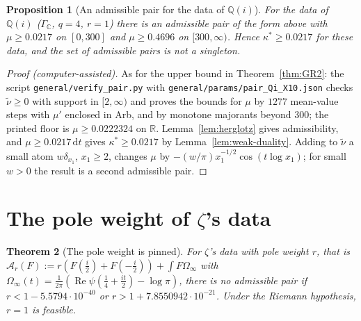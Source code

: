 \documentclass[11pt]{amsart}
\newcommand{\RR}{\mathbb R}
\newcommand{\QQ}{\mathbb Q}
\newcommand{\dd}{\,\mathrm d}
\renewcommand{\Re}{\operatorname{Re}}
\newcommand{\GC}{\Gamma_{\mathbb C}}
\newcommand{\Oinf}{\Omega_\infty}
\newcommand{\Arch}{\mathcal A}
\newcommand{\kstar}{\kappa^{*}}
\newtheorem{theorem}{Theorem}[section]
\newtheorem{proposition}[theorem]{Proposition}
\theoremstyle{definition}
\theoremstyle{remark}
\numberwithin{equation}{section}
\begin{document}
\begin{proposition}[An admissible pair for the data of $\QQ(i)$]\label{prop:Qi}
For the data of $\QQ(i)$ \textup{(}$\GC$, $q=4$, $r=1$\textup{)} there is an admissible pair of the form above with $\mu\ge0.0217$ on
$[0,300]$ and $\mu\ge0.4696$ on $[300,\infty)$. Hence $\kstar\ge0.0217$ for these data, and the set of admissible pairs is not a
singleton.
\end{proposition}

\begin{proof}[Proof \textup{(computer-assisted)}]
As for the upper bound in Theorem~\ref{thm:GR2}: the script \nolinkurl{general/verify_pair.py} with
\nolinkurl{general/params/pair_Qi_X10.json} checks $\tilde\nu\ge0$ with support in $[2,\infty)$ and proves the bounds for $\mu$ by
$1277$ mean-value steps with $\mu'$ enclosed in Arb, and by monotone majorants beyond $300$; the printed floor is
$\mu\ge0.0222324$ on $\RR$. Lemma~\ref{lem:herglotz} gives admissibility, and $\mu\ge0.0217\dd t$ gives $\kstar\ge0.0217$ by
Lemma~\ref{lem:weak-duality}. Adding to $\tilde\nu$ a small atom $w\delta_{x_1}$, $x_1\ge2$, changes $\mu$ by
$-(w/\pi)x_1^{-1/2}\cos(t\log x_1)$; for small $w>0$ the result is a second admissible pair.
\end{proof}

\section{The pole weight of \texorpdfstring{$\zeta$}{zeta}'s data}\label{sec:pole}

\begin{theorem}[The pole weight is pinned]\label{thm:polepin}
For $\zeta$'s data with pole weight $r$, that is $\Arch_r(F):=r(F(\frac i2)+F(-\frac i2))+\int F\Oinf$ with
$\Oinf(t)=\frac1{2\pi}(\Re\psi(\frac14+\frac{it}2)-\log\pi)$, there is no admissible pair if $r<1-5.5794\cdot10^{-40}$ or
$r>1+7.8550942\cdot10^{-21}$. Under the Riemann hypothesis, $r=1$ is feasible.
\end{theorem}
\end{document}
